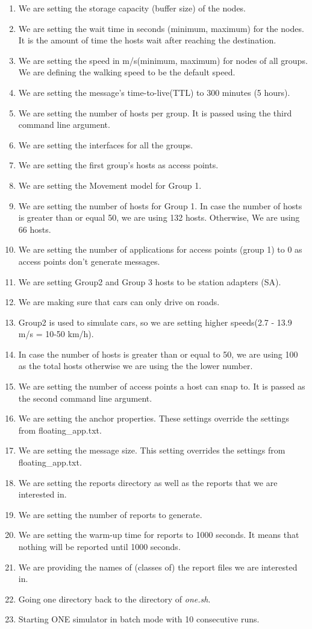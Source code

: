 \begin{enumerate}
  \item We are setting the storage capacity (buffer size) of the nodes.
\item We are setting the wait time in seconds (minimum, maximum) for the nodes. It is the amount of time the hosts wait after reaching the destination.
\item We are setting the speed in m/s(minimum, maximum) for nodes of all groups. We are defining the walking speed to be the default speed.
\item We are setting the message's time-to-live(TTL) to 300 minutes (5 hours).
\item We are setting the number of hosts per group. It is passed using the third command line argument.
\item We are setting the interfaces for all the groups.
\item We are setting the first group's hosts as access points.
\item We are setting the Movement model for Group 1.
\item We are setting the number of hosts for Group 1. In case the number of hosts is greater than or equal 50, we are using 132 hosts. Otherwise, We are using 66 hosts.
\item We are setting the number of applications for access points (group 1) to 0 as access points don't generate messages.
\item We are setting Group2 and Group 3 hosts to be station adapters (SA).
\item We are making sure that cars can only drive on roads.
\item Group2 is used to simulate cars, so we are setting higher speeds(2.7 - 13.9 m/s = 10-50 km/h).
\item In case the number of hosts is greater than or equal to 50, we are using 100 as the total hosts otherwise we are using the the lower number.
\item We are setting the number of access points a host can snap to. It is passed as the second command line argument.
\item We are setting the anchor properties. These settings override the settings from floating\_app.txt.
\item We are setting the message size. This setting overrides the settings from floating\_app.txt.
\item We are setting the reports directory as well as the reports that we are interested in.
\item We are setting the number of reports to generate.
\item We are setting the warm-up time for reports to 1000 seconds. It means that nothing will be reported until 1000 seconds.
\item We are providing the names of (classes of) the report files we are interested in.
\item Going one directory back to the directory of \textit{one.sh}.
\item Starting ONE simulator in batch mode with 10 consecutive runs.
\end{enumerate}

